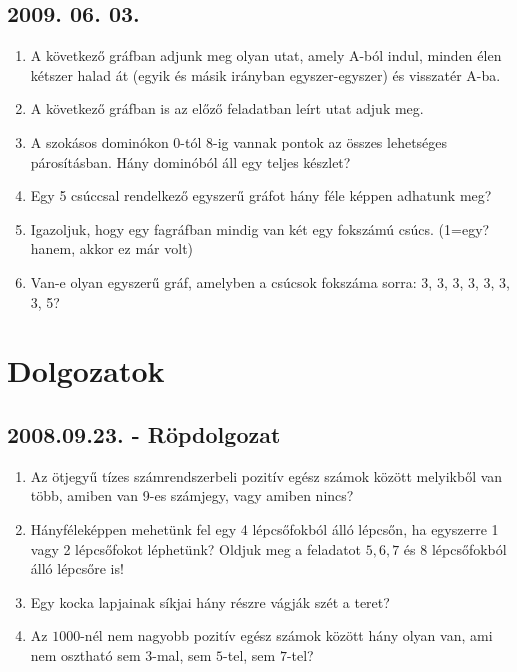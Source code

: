 \subsection*{2009. 06. 03.}
\begin{enumerate}
\item A következő gráfban adjunk meg olyan utat, amely A-ból indul, minden élen kétszer halad át (egyik és másik irányban egyszer-egyszer) és visszatér A-ba.
\item A következő gráfban is az előző feladatban leírt utat adjuk meg.
\item A szokásos dominókon 0-tól 8-ig vannak pontok az összes lehetséges párosításban. Hány dominóból áll egy teljes készlet?
\item Egy 5 csúccsal rendelkező egyszerű gráfot hány féle képpen adhatunk meg?
\item Igazoljuk, hogy egy fagráfban mindig van két egy fokszámú csúcs. (1=egy? hanem, akkor ez már volt)
\item Van-e olyan egyszerű gráf, amelyben a csúcsok fokszáma sorra: 3, 3, 3, 3, 3, 3, 3, 5?
\end{enumerate}

\section{Dolgozatok}

\subsection*{2008.09.23. - Röpdolgozat}
\begin{enumerate}
\item Az ötjegyű tízes számrendszerbeli pozitív egész számok között melyikből van több, amiben van 9-es számjegy, vagy amiben nincs?
\item Hányféleképpen mehetünk fel egy 4 lépcsőfokból álló lépcsőn, ha egyszerre 1 vagy 2 lépcsőfokot léphetünk? Oldjuk meg a feladatot $5,6,7$ és $8$ lépcsőfokból álló lépcsőre is!
\item Egy kocka lapjainak síkjai hány részre vágják szét a teret? 
\item Az $1000$-nél nem nagyobb pozitív egész számok között hány olyan van, ami nem osztható sem $3$-mal, sem $5$-tel, sem $7$-tel?


\end{enumerate}
